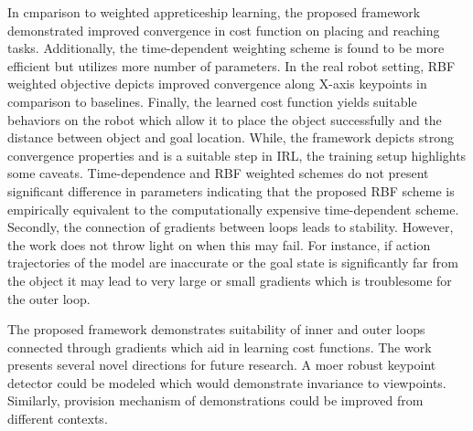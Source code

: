 \documentclass[11pt,letterpaper]{article}
\begin{document}
In cmparison to weighted appreticeship learning, the proposed framework demonstrated improved convergence in cost function on placing and reaching tasks. Additionally, the time-dependent weighting scheme is found to be more efficient but utilizes more number of parameters. In the real robot setting, RBF weighted objective depicts improved convergence along X-axis keypoints in comparison to baselines. Finally, the learned cost function yields suitable behaviors on the robot which allow it to place the object successfully and the distance between object and goal location. While, the framework depicts strong convergence properties and is a suitable step in IRL, the training setup highlights some caveats. Time-dependence and RBF weighted schemes do not present significant difference in parameters indicating that the proposed RBF scheme is empirically equivalent to the computationally expensive time-dependent scheme. Secondly, the connection of gradients between loops leads to stability. However, the work does not throw light on when this may fail. For instance, if action trajectories of the model are inaccurate or the goal state is significantly far from the object it may lead to very large or small gradients which is troublesome for the outer loop.

The proposed framework demonstrates suitability of inner and outer loops connected through gradients which aid in learning cost functions. The work presents several novel directions for future research. A moer robust keypoint detector could be modeled which would demonstrate invariance to viewpoints. Similarly, provision mechanism of demonstrations could be improved from different contexts. 
\end{document}
